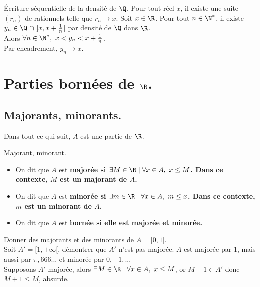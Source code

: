 \documentclass[11pt]{article}
\begin{document}
\vspace*{-0.5cm}

\begin{corr}{Écriture séquentielle de la densité de $\Q$.}{}
    Pour tout réel $x$, il existe une suite $(r_n)$ de rationnels telle que $r_n\to x$.
    \tcblower
    Soit $x\in\R$. Pour tout $n\in\N^*$, il existe $y_n\in\Q~\cap~]x,x+\frac{1}{n}$[ par densité de $\Q$ dans $\R$.\\
    Alors $\forall n\in\N^*, ~ x<y_n<x+\frac{1}{n}$.\\
    Par encadrement, $y_n\to x$. 
\end{corr}

\section{Parties bornées de \texorpdfstring{$\R$}{Lg}.}

\subsection{Majorants, minorants.}

Dans tout ce qui suit, $A$ est une partie de $\R$.

\begin{defi}{Majorant, minorant.}{}
    \begin{itemize}
        \item On dit que $A$ est \bf{majorée} si $\exists M\in\R\mid\forall x\in A,~ x\leq M$.
        Dans ce contexte, $M$ est un \bf{majorant} de $A$.
        \item On dit que $A$ est \bf{minorée} si $\exists m\in\R\mid\forall x\in A,~ m\leq x$.
        Dans ce contexte, $m$ est un \bf{minorant} de $A$.
        \item On dit que $A$ est \bf{bornée} si elle est majorée et minorée.
    \end{itemize}
\end{defi}

\vspace*{-0.7cm}

\begin{ex}{}{}
    Donner des majorants et des minorants de $A=[0,1[$.\\
    Soit $A'=[1,+\infty[$, démontrer que $A'$ n'est pas majorée.
    \tcblower
    $A$ est majorée par $1$, mais aussi par $\pi,666$... et minorée par $0, -1,...$\\
    Supposons $A'$ majorée, alors $\exists M\in\R\mid\forall x\in A,~x\leq M$, or $M+1\in A'$ donc $M+1\leq M$, absurde.
\end{ex}
\end{document}
